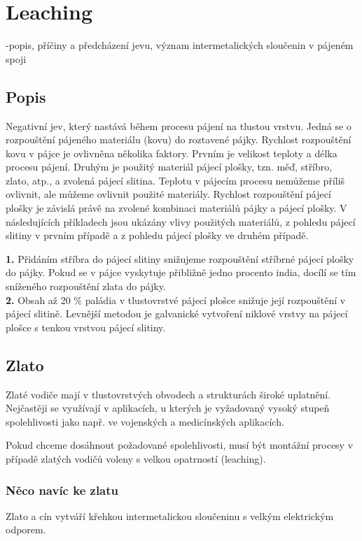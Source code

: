\section{Leaching}
-popis, příčiny a předcházení jevu, význam intermetalických sloučenin v pájeném spoji

\subsection{Popis}
Negativní jev, který nastává během procesu pájení na tlustou vrstvu. Jedná se o rozpouštění pájeného materiálu (kovu) do roztavené pájky. Rychlost rozpouštění kovu v pájce je ovlivněna několika faktory. Prvním je velikost teploty a délka procesu
pájení. Druhým je použitý materiál pájecí plošky, tzn. měď, stříbro, zlato, atp., a zvolená pájecí slitina. Teplotu v pájecím procesu nemůžeme příliš ovlivnit, ale můžeme ovlivnit použité materiály. Rychlost rozpouštění pájecí plošky je závislá právě na zvolené kombinaci materiálů pájky a pájecí plošky. V následujících příkladech jsou ukázány vlivy použitých materiálů, z pohledu pájecí slitiny v prvním případě a z pohledu pájecí plošky ve druhém případě.

\textbf{1.} Přidáním stříbra do pájecí slitiny snižujeme rozpouštění stříbrné pájecí plošky do pájky. Pokud
se v pájce vyskytuje přibližně jedno procento india, docílí se tím sníženého rozpouštění zlata do pájky.\\
\textbf{2.} Obsah až 20 \% paládia v tlustovrstvé pájecí plošce snižuje její rozpouštění v pájecí slitině.
Levnější metodou je galvanické vytvoření niklové vrstvy na pájecí plošce s tenkou vrstvou pájecí slitiny.

\subsection{Zlato}
Zlaté vodiče mají v tlustovrstvých obvodech a strukturách široké uplatnění. Nejčastěji se využívají v aplikacích, u kterých je vyžadovaný vysoký stupeň spolehlivosti jako např. ve vojenských a medicínských aplikacích.

Pokud chceme dosáhnout požadované spolehlivosti, musí být montážní procesy v případě
zlatých vodičů voleny s velkou opatrností (leaching).
\subsubsection{Něco navíc ke zlatu}
Zlato a cín vytváří křehkou intermetalickou sloučeninu s velkým elektrickým odporem.

